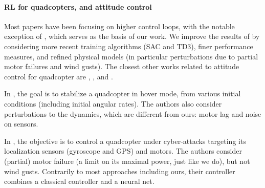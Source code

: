 \documentclass[anonymous=true,format=sigconf, screen=true, review=false]{acmart}
\begin{document}
\paragraph{RL for quadcopters, and attitude control}

Most papers have been focusing on higher control loops, with the notable exception of \cite{rl}, which serves as the basis of our work. 
We improve the results of \cite{rl} by considering more recent training algorithms (SAC and TD3), finer performance measures, and refined physical models (in particular perturbations due to partial motor failures and wind gusts). 
The closest other works related to attitude control for quadcopter are \cite{simtoreal}, \cite{fei2020learn}, \cite{Koning} and \cite{stockholm}. %

In \cite{simtoreal}, the goal is to stabilize a quadcopter in hover mode, from various initial conditions (including initial angular rates). The authors also consider perturbations to the dynamics, which are different from ours: motor lag and noise on sensors. 
 
In \cite{fei2020learn}, the objective is to control a quadcopter under cyber-attacks targeting its localization sensors (gyroscope and GPS) and motors. The authors consider (partial) motor failure (a limit on its maximal power, just like we do), but not wind gusts. Contrarily to most approaches including ours, their controller combines a classical controller and a neural net.%

 
\end{document}
